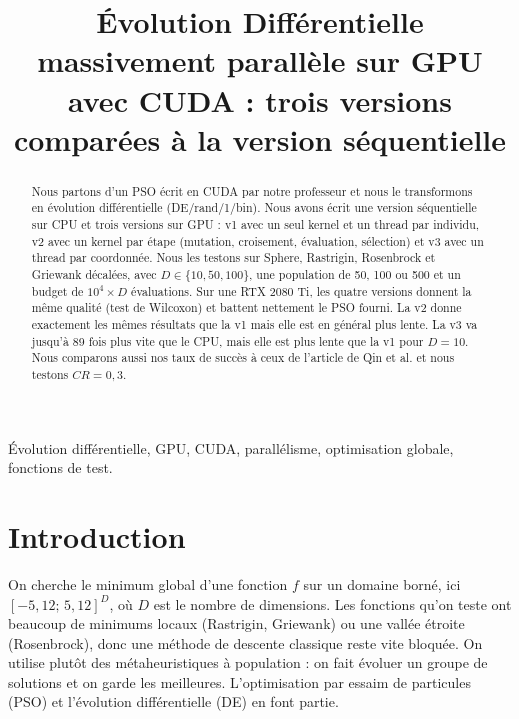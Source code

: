 \documentclass[conference]{IEEEtran}
\begin{document}
\title{\'Evolution Diff\'erentielle massivement parall\`ele sur GPU avec CUDA : trois versions compar\'ees \`a la version s\'equentielle}

\author{
}

\maketitle

\begin{abstract}
Nous partons d'un PSO \'ecrit en CUDA par notre professeur et nous le transformons en \'evolution diff\'erentielle (DE/rand/1/bin). Nous avons \'ecrit une version s\'equentielle sur CPU et trois versions sur GPU : v1 avec un seul kernel et un thread par individu, v2 avec un kernel par \'etape (mutation, croisement, \'evaluation, s\'election) et v3 avec un thread par coordonn\'ee. Nous les testons sur Sphere, Rastrigin, Rosenbrock et Griewank d\'ecal\'ees, avec $D\in\{10,50,100\}$, une population de 50, 100 ou 500 et un budget de $10^4\times D$ \'evaluations. Sur une RTX 2080 Ti, les quatre versions donnent la m\^eme qualit\'e (test de Wilcoxon) et battent nettement le PSO fourni. La v2 donne exactement les m\^emes r\'esultats que la v1 mais elle est en g\'en\'eral plus lente. La v3 va jusqu'\`a 89 fois plus vite que le CPU, mais elle est plus lente que la v1 pour $D=10$. Nous comparons aussi nos taux de succ\`es \`a ceux de l'article de Qin et al. et nous testons $CR=0{,}3$.
\end{abstract}

\begin{IEEEkeywords}
\'Evolution diff\'erentielle, GPU, CUDA, parall\'elisme, optimisation globale, fonctions de test.
\end{IEEEkeywords}

\section{Introduction}
On cherche le minimum global d'une fonction $f$ sur un domaine born\'e, ici $[-5{,}12;\,5{,}12]^D$, o\`u $D$ est le nombre de dimensions. Les fonctions qu'on teste ont beaucoup de minimums locaux (Rastrigin, Griewank) ou une vall\'ee \'etroite (Rosenbrock), donc une m\'ethode de descente classique reste vite bloqu\'ee. On utilise plut\^ot des m\'etaheuristiques \`a population : on fait \'evoluer un groupe de solutions et on garde les meilleures. L'optimisation par essaim de particules (PSO) et l'\'evolution diff\'erentielle (DE) \cite{storn} en font partie.
\end{document}
